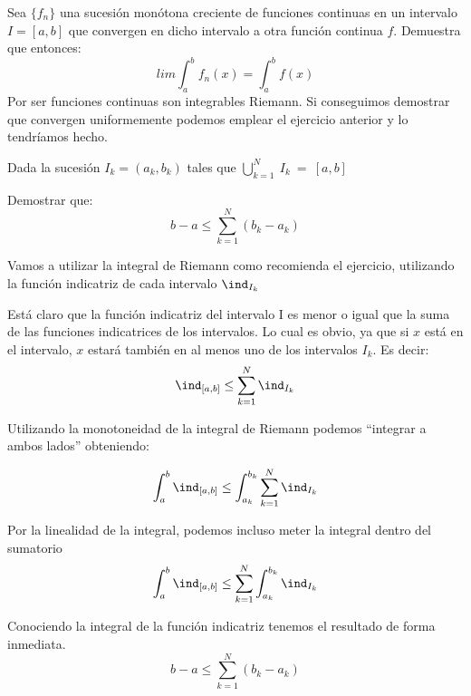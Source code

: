 \begin{problem}[6]

Sea $\lbrace f_n \rbrace$ una sucesión monótona creciente de funciones continuas en un intervalo $I=[a,b]$ que convergen en dicho intervalo a otra función continua $f$. Demuestra que entonces:
\[ lim \int_{a}^{b} f_n(x) = \int_{a}^{b} f(x) \]
\solution
Por ser funciones continuas son integrables Riemann. Si conseguimos demostrar que convergen uniformemente podemos emplear el ejercicio anterior y lo tendríamos hecho.
\end{problem}

\begin{problem}[7]
Dada la sucesión $I_k = (a_k, b_k)$ tales que $\bigcup_{k=1}^{N}~I_k~=~[a,b]$

Demostrar que:
\[b-a \leq \sum_{k=1}^N (b_k - a_k)\]

\solution
Vamos a utilizar la integral de Riemann como recomienda el ejercicio, utilizando la función indicatriz de cada intervalo $\ind_{I_k}$

Está claro que la función indicatriz del intervalo I es menor o igual que la suma de las funciones indicatrices de los intervalos. Lo cual es obvio, ya que si $x$ está en el intervalo, $x$ estará también en al menos uno de los intervalos $I_k$. Es decir:
\[\ind_{[a,b]} \leq \sum_{k=1}^{N} \ind_{I_k}\]

Utilizando la monotoneidad de la integral de Riemann podemos ``integrar a ambos lados'' obteniendo:

\[\int_{a}^{b} \ind_{[a,b]} \leq \int_{a_k}^{b_k} \sum_{k=1}^{N} \ind_{I_k}\]

Por la linealidad de la integral, podemos incluso meter la integral dentro del sumatorio
\[\int_{a}^{b} \ind_{[a,b]} \leq \sum_{k=1}^{N} \int_{a_k}^{b_k} \ind_{I_k}\]


Conociendo la integral de la función indicatriz tenemos el resultado de forma inmediata.
\[b-a \leq \sum_{k=1}^{N} ( b_k - a_k )\]

\end{problem}

